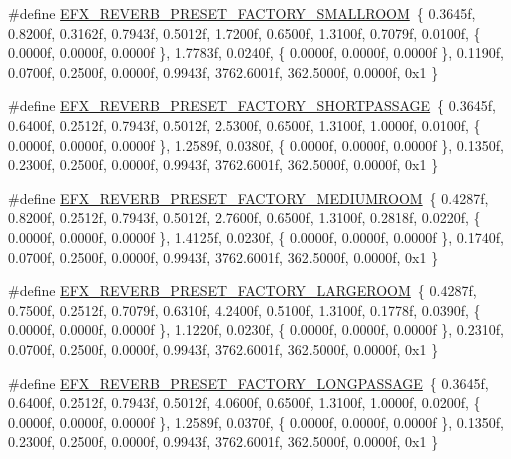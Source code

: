 \begin{DoxyCompactItemize}
\item 
\#define \mbox{\hyperlink{efx-presets_8h_a8b506e3ba97654c5fa50fe5c37b732d9}{E\+F\+X\+\_\+\+R\+E\+V\+E\+R\+B\+\_\+\+P\+R\+E\+S\+E\+T\+\_\+\+F\+A\+C\+T\+O\+R\+Y\+\_\+\+S\+M\+A\+L\+L\+R\+O\+OM}}~\{ 0.\+3645f, 0.\+8200f, 0.\+3162f, 0.\+7943f, 0.\+5012f, 1.\+7200f, 0.\+6500f, 1.\+3100f, 0.\+7079f, 0.\+0100f, \{ 0.\+0000f, 0.\+0000f, 0.\+0000f \}, 1.\+7783f, 0.\+0240f, \{ 0.\+0000f, 0.\+0000f, 0.\+0000f \}, 0.\+1190f, 0.\+0700f, 0.\+2500f, 0.\+0000f, 0.\+9943f, 3762.\+6001f, 362.\+5000f, 0.\+0000f, 0x1 \}
\item 
\#define \mbox{\hyperlink{efx-presets_8h_affa348a7c6bf72fbc9eca06a9d1815ec}{E\+F\+X\+\_\+\+R\+E\+V\+E\+R\+B\+\_\+\+P\+R\+E\+S\+E\+T\+\_\+\+F\+A\+C\+T\+O\+R\+Y\+\_\+\+S\+H\+O\+R\+T\+P\+A\+S\+S\+A\+GE}}~\{ 0.\+3645f, 0.\+6400f, 0.\+2512f, 0.\+7943f, 0.\+5012f, 2.\+5300f, 0.\+6500f, 1.\+3100f, 1.\+0000f, 0.\+0100f, \{ 0.\+0000f, 0.\+0000f, 0.\+0000f \}, 1.\+2589f, 0.\+0380f, \{ 0.\+0000f, 0.\+0000f, 0.\+0000f \}, 0.\+1350f, 0.\+2300f, 0.\+2500f, 0.\+0000f, 0.\+9943f, 3762.\+6001f, 362.\+5000f, 0.\+0000f, 0x1 \}
\item 
\#define \mbox{\hyperlink{efx-presets_8h_afdd5df2559d5c60aa4a4729412405d06}{E\+F\+X\+\_\+\+R\+E\+V\+E\+R\+B\+\_\+\+P\+R\+E\+S\+E\+T\+\_\+\+F\+A\+C\+T\+O\+R\+Y\+\_\+\+M\+E\+D\+I\+U\+M\+R\+O\+OM}}~\{ 0.\+4287f, 0.\+8200f, 0.\+2512f, 0.\+7943f, 0.\+5012f, 2.\+7600f, 0.\+6500f, 1.\+3100f, 0.\+2818f, 0.\+0220f, \{ 0.\+0000f, 0.\+0000f, 0.\+0000f \}, 1.\+4125f, 0.\+0230f, \{ 0.\+0000f, 0.\+0000f, 0.\+0000f \}, 0.\+1740f, 0.\+0700f, 0.\+2500f, 0.\+0000f, 0.\+9943f, 3762.\+6001f, 362.\+5000f, 0.\+0000f, 0x1 \}
\item 
\#define \mbox{\hyperlink{efx-presets_8h_a702eccce6fa335c50cd88b25585c99ed}{E\+F\+X\+\_\+\+R\+E\+V\+E\+R\+B\+\_\+\+P\+R\+E\+S\+E\+T\+\_\+\+F\+A\+C\+T\+O\+R\+Y\+\_\+\+L\+A\+R\+G\+E\+R\+O\+OM}}~\{ 0.\+4287f, 0.\+7500f, 0.\+2512f, 0.\+7079f, 0.\+6310f, 4.\+2400f, 0.\+5100f, 1.\+3100f, 0.\+1778f, 0.\+0390f, \{ 0.\+0000f, 0.\+0000f, 0.\+0000f \}, 1.\+1220f, 0.\+0230f, \{ 0.\+0000f, 0.\+0000f, 0.\+0000f \}, 0.\+2310f, 0.\+0700f, 0.\+2500f, 0.\+0000f, 0.\+9943f, 3762.\+6001f, 362.\+5000f, 0.\+0000f, 0x1 \}
\item 
\#define \mbox{\hyperlink{efx-presets_8h_a2e0c4cc4ac7d102d391c8edc50417df5}{E\+F\+X\+\_\+\+R\+E\+V\+E\+R\+B\+\_\+\+P\+R\+E\+S\+E\+T\+\_\+\+F\+A\+C\+T\+O\+R\+Y\+\_\+\+L\+O\+N\+G\+P\+A\+S\+S\+A\+GE}}~\{ 0.\+3645f, 0.\+6400f, 0.\+2512f, 0.\+7943f, 0.\+5012f, 4.\+0600f, 0.\+6500f, 1.\+3100f, 1.\+0000f, 0.\+0200f, \{ 0.\+0000f, 0.\+0000f, 0.\+0000f \}, 1.\+2589f, 0.\+0370f, \{ 0.\+0000f, 0.\+0000f, 0.\+0000f \}, 0.\+1350f, 0.\+2300f, 0.\+2500f, 0.\+0000f, 0.\+9943f, 3762.\+6001f, 362.\+5000f, 0.\+0000f, 0x1 \}

\end{DoxyCompactItemize}

